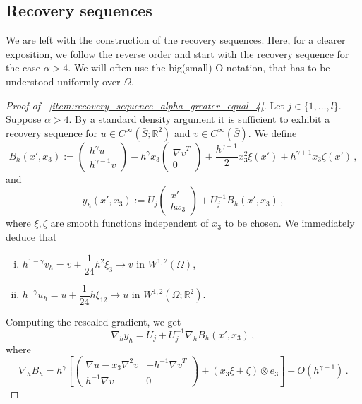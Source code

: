 \documentclass{article}
\theoremstyle{plain}
\theoremstyle{plain}
\theoremstyle{plain}
\theoremstyle{plain}
\theoremstyle{plain}
\theoremstyle{definition}
\theoremstyle{definition}
\renewcommand{\r}{\mathbb{R}}
\begin{document}
\subsection{Recovery sequences}

We are left with the construction of the recovery sequences. Here, for a clearer exposition, we follow the reverse order and start with the recovery sequence for the case $\alpha > 4$. We will often use the big(small)-O notation, that has to be understood uniformly over $\Omega$.

\begin{proof}[Proof of --\ref{item:recovery_sequence_alpha_greater_equal_4}]
    Let $j \in \{1, \dots, l\}$. Suppose $\alpha > 4$. By a standard density argument it is sufficient to exhibit a recovery sequence for $u \in C^{\infty}(\bar S; \r^2)$ and $v \in C^\infty(\bar S)$. We define
    \[
        B_h(x', x_3) := \begin{pmatrix}
            h^\gamma u\\
            h^{\gamma - 1} v
        \end{pmatrix} - h^{\gamma} x_3 \begin{pmatrix}
            {\nabla v}^T\\
            0
        \end{pmatrix} + \dfrac{h^{\gamma + 1}}{2} x_3^2 \xi(x') + h^{\gamma + 1} x_3 \zeta(x') \,,
    \]
    and
    \[
        y_h(x', x_3) := U_j\begin{pmatrix}
            x'\\
            h x_3
        \end{pmatrix} + U_j^{-1}B_h(x', x_3) \,,
    \]
    where $\xi, \zeta$ are smooth functions independent of $x_3$ to be chosen. We immediately deduce that
    \begin{enumerate}[(i)]
        \item $h^{1-\gamma} v_h = v + \dfrac{1}{24}h^2\xi_3 \to v$ in $W^{1, 2}(\Omega)$,
        \item $ h^{-\gamma} u_h = u + \dfrac{1}{24}h \xi_{12} \to u$ in $W^{1, 2}(\Omega; \r^2)$.
    \end{enumerate}
    Computing the rescaled gradient, we get
    \[
        \nabla_h y_h = U_j + U_j^{-1} \nabla_h B_h(x', x_3) \,,
    \]
    where
    \[
        \nabla_h B_h = h^{\gamma}\left[ \begin{pmatrix}
            \nabla u - x_3\nabla^2 v & -h^{-1}{\nabla v}^T\\
            h^{-1} {\nabla v} & 0
        \end{pmatrix} + (x_3 \xi + \zeta) \otimes e_3 \right] + O(h^{\gamma+1}) \,.
\]
\end{proof}
\end{document}
